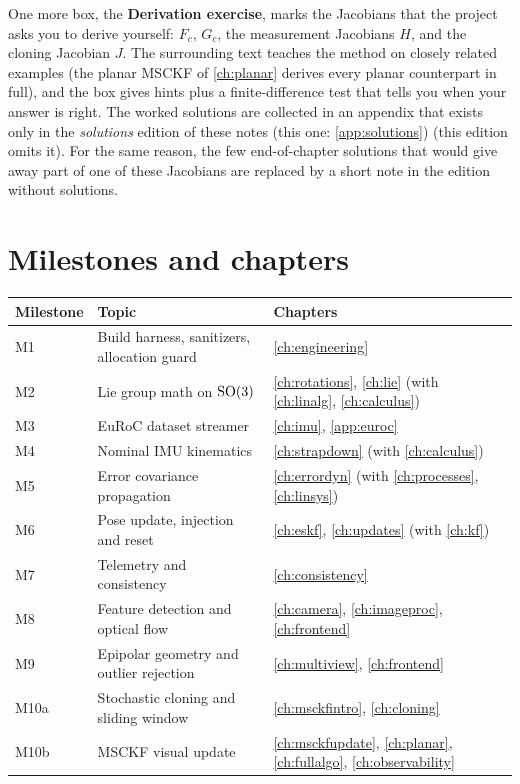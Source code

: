One more box, the \textbf{Derivation exercise}, marks the Jacobians that the project asks you to
derive yourself: $F_c$, $G_c$, the measurement Jacobians $H$, and the cloning Jacobian $J$. The
surrounding text teaches the method on closely related examples (the planar MSCKF of \cref{ch:planar} derives
every planar counterpart in full), and the box gives hints plus a finite-difference test that tells you when your
answer is right. The worked solutions are collected in an appendix that exists only in the \emph{solutions} edition of
these notes\ifsolutions{} (this one: \cref{app:solutions})\else{} (this edition omits it)\fi. For the same reason, the few end-of-chapter
solutions that would give away part of one of these Jacobians are replaced by a short note in the edition without solutions.

\section*{Milestones and chapters}

\begin{table}[h]
\centering\small
\begin{tabularx}{\textwidth}{@{}l X l@{}}
\toprule
\textbf{Milestone} & \textbf{Topic} & \textbf{Chapters} \\
\midrule
M1 & Build harness, sanitizers, allocation guard & \ref{ch:engineering} \\
M2 & Lie group math on $\mathrm{SO}(3)$ & \ref{ch:rotations}, \ref{ch:lie} (with \ref{ch:linalg}, \ref{ch:calculus}) \\
M3 & EuRoC dataset streamer & \ref{ch:imu}, \cref{app:euroc} \\
M4 & Nominal IMU kinematics & \ref{ch:strapdown} (with \ref{ch:calculus}) \\
M5 & Error covariance propagation & \ref{ch:errordyn} (with \ref{ch:processes}, \ref{ch:linsys}) \\
M6 & Pose update, injection and reset & \ref{ch:eskf}, \ref{ch:updates} (with \ref{ch:kf}) \\
M7 & Telemetry and consistency & \ref{ch:consistency} \\
M8 & Feature detection and optical flow & \ref{ch:camera}, \ref{ch:imageproc}, \ref{ch:frontend} \\
M9 & Epipolar geometry and outlier rejection & \ref{ch:multiview}, \ref{ch:frontend} \\
M10a & Stochastic cloning and sliding window & \ref{ch:msckfintro}, \ref{ch:cloning} \\
M10b & MSCKF visual update & \ref{ch:msckfupdate}, \ref{ch:planar}, \ref{ch:fullalgo}, \ref{ch:observability} \\
\bottomrule
\end{tabularx}
\end{table}

